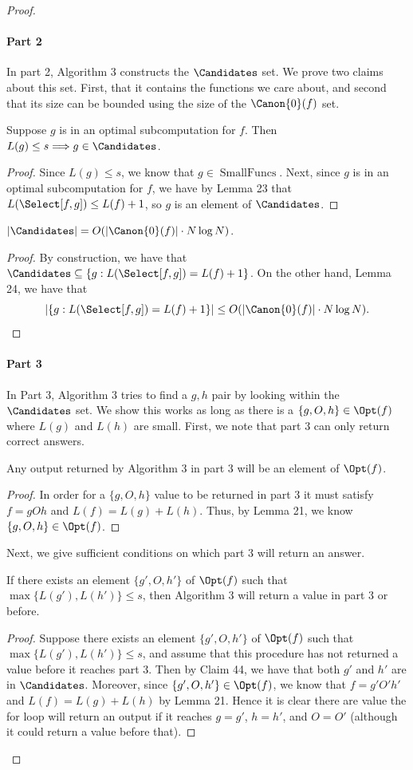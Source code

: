 \begin{proof}
\paragraph{Part 2}
In part 2, Algorithm 3 constructs the $\Candidates$ set. We prove two claims about this set. First, that it contains the functions we care about, and second that its size can be bounded using the size of the $\Canon{0}(f)$ set.
\begin{ntclaim}
Suppose $g$ is in an optimal subcomputation for $f$. Then $L(g)\leq s\Longrightarrow g\in\Candidates$.
\end{ntclaim}
\begin{proof}
Since $L(g)\leq s$, we know that $g\in\operatorname{SmallFuncs}$. Next, since $g$ is in an optimal subcomputation for $f$, we have by Lemma 23 that $L(\Select[f,g])\leq L(f)+1$, so $g$ is an element of $\Candidates$.
\end{proof}
\begin{ntclaim}
$|\Candidates|=O(|\Canon{0}(f)|\cdot N\log N)$.
\end{ntclaim}
\begin{proof}
By construction, we have that $\Candidates\subseteq\{g:L(\Select[f,g])=L(f)+1\}$. On the other hand, Lemma 24, we have that
\[|\{g:L(\Select[f,g])=L(f)+1\}|\leq O(|\Canon{0}(f)|\cdot N\log N).\]
\end{proof}
\paragraph{Part 3}
In Part 3, Algorithm 3 tries to find a $g,h$ pair by looking within the $\Candidates$ set. We show this works as long as there is a $\{g,O,h\}\in\Opt(f)$ where $L(g)$ and $L(h)$ are small.
First, we note that part 3 can only return correct answers.
\begin{ntclaim}
Any output returned by Algorithm 3 in part 3 will be an element of $\Opt(f)$.
\end{ntclaim}
\begin{proof}
In order for a $\{g,O,h\}$ value to be returned in part 3 it must satisfy $f=gOh$ and $L(f)=L(g)+L(h)$. Thus, by Lemma 21, we know $\{g,O,h\}\in\Opt(f)$.
\end{proof}
Next, we give sufficient conditions on which part 3 will return an answer.
\begin{ntclaim}
If there exists an element $\{g',O,h'\}$ of $\Opt(f)$ such that $\max\{L(g'),L(h')\}\leq s$, then Algorithm 3 will return a value in part 3 or before.
\end{ntclaim}
\begin{proof}
Suppose there exists an element $\{g',O,h'\}$ of $\Opt(f)$ such that $\max\{L(g'),L(h')\}\leq s$, and assume that this procedure has not returned a value before it reaches part 3. Then by Claim 44, we have that both $g'$ and $h'$ are in $\Candidates$. Moreover, since $\{g',O,h'\}\in\Opt(f)$, we know that $f=g'O'h'$ and $L(f)=L(g)+L(h)$ by Lemma 21. Hence it is clear there are value the for loop will return an output if it reaches $g=g'$, $h=h'$, and $O=O'$ (although it could return a value before that).
\end{proof}

\end{proof}
